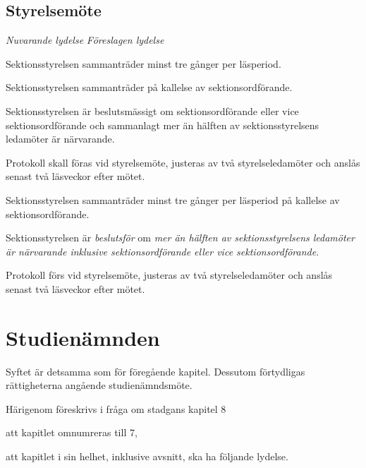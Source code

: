 \documentclass{article}
\newenvironment{lydelse}
    {\begin{paracol}{2}%
        \emph{Nuvarande lydelse}%
        \switchcolumn%
        \emph{Föreslagen lydelse}%
    \end{paracol}%
    \begin{enumerate}[label=\thesubsection.\arabic*]%
    \begin{paracol}{2}%
    }{\end{paracol}\end{enumerate}}
\begin{document}

\subsection{Styrelsemöte}
\begin{lydelse}
  \setcounter{section}{7}
  \setcounter{subsection}{5}
  \item Sektionsstyrelsen sammanträder minst tre gånger per läsperiod.
  \item Sektionsstyrelsen sammanträder på kallelse av sektionsordförande.
  \setcounter{subsection}{6}
  \setcounter{enumi}{0}
  \item Sektionsstyrelsen är beslutsmässigt om sektionsordförande eller vice sektionsordförande och sammanlagt mer än hälften av sektionsstyrelsens ledamöter är närvarande.
  \setcounter{subsection}{8}
  \setcounter{enumi}{0}
  \item Protokoll skall föras vid styrelsemöte, justeras av två
    styrelseledamöter och anslås senast två läsveckor efter mötet.
  \switchcolumn  

  \item Sektionsstyrelsen sammanträder minst tre gånger per läsperiod på kallelse av sektionsordförande.
  \item Sektionsstyrelsen är \emph{beslutsför} om \emph{mer än hälften av sektionsstyrelsens ledamöter är närvarande inklusive sektionsordförande eller vice sektionsordförande}.
  \item Protokoll förs vid styrelsemöte, justeras av två styrelseledamöter och anslås senast två läsveckor efter mötet.
\end{lydelse}
\setcounter{section}{6}
\setcounter{subsection}{2}

\section{Studienämnden}
Syftet är detsamma som för föregående kapitel.
Dessutom förtydligas rättigheterna angående studienämndsmöte.

Härigenom föreskrivs i fråga om stadgans kapitel 8
\begin{dels}
\item att kapitlet omnumreras till 7,
\item att kapitlet i sin helhet, inklusive avsnitt, ska ha följande lydelse.
\end{dels}
\end{document}
